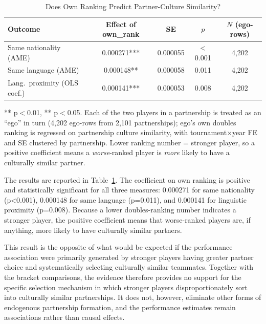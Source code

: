 \documentclass[10pt]{article}
\begin{document}
\begin{table}[htbp]
\color{blue}
\centering
\caption{Does Own Ranking Predict Partner-Culture Similarity? \label{tab:t8}}
\begin{threeparttable}
\begin{tabular}{lcccc}
\toprule
Outcome & Effect of own\_rank & SE & $p$ & $N$ (ego-rows) \\
\midrule
Same nationality (AME) & 0.000271*** & 0.000055 & $<$0.001 & 4,202 \\
Same language (AME) & 0.000148** & 0.000058 & 0.011 & 4,202 \\
Lang.\ proximity (OLS coef.) & 0.000141*** & 0.000053 & 0.008 & 4,202 \\
\bottomrule
\end{tabular}
\begin{tablenotes}
\small
\item *** p$<$0.01, ** p$<$0.05. Each of the two players in a partnership is treated as an ``ego'' in turn (4,202 ego-rows from 2,101 partnerships); ego's own doubles ranking is regressed on partnership culture similarity, with tournament$\times$year FE and SE clustered by partnership. Lower ranking number = stronger player, so a positive coefficient means a \emph{worse}-ranked player is \emph{more} likely to have a culturally similar partner.
\end{tablenotes}
\end{threeparttable}
\end{table}
\FloatBarrier
The results are reported in Table~\ref{tab:t8}. The coefficient on own ranking is positive and statistically significant for all three measures: 0.000271 for same nationality (p<0.001), 0.000148 for same language (p=0.011), and 0.000141 for linguistic proximity (p=0.008). Because a lower doubles-ranking number indicates a stronger player, the positive coefficient means that worse-ranked players are, if anything, more likely to have culturally similar partners.

This result is the opposite of what would be expected if the performance association were primarily generated by stronger players having greater partner choice and systematically selecting culturally similar teammates. Together with the bracket comparisons, the evidence therefore provides no support for the specific selection mechanism in which stronger players disproportionately sort into culturally similar partnerships. It does not, however, eliminate other forms of endogenous partnership formation, and the performance estimates remain associations rather than causal effects.
\end{document}
